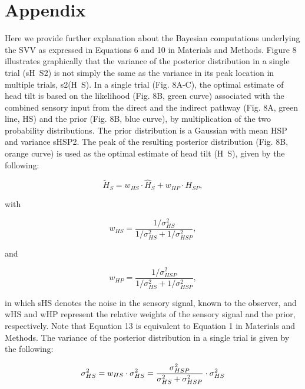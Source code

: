 \section{Appendix}

Here we provide further explanation about the Bayesian computations underlying the SVV as expressed in Equations 6 and 10 in Materials and Methods. Figure 8 illustrates graphically that the variance of the posterior distribution in a single trial (sH~S2) is not simply the same as the variance in its peak location in multiple trials, s2(H~S). In a single trial (Fig. 8A-C), the optimal estimate of head tilt is based on the likelihood (Fig. 8B, green curve) associated with the combined sensory input from the direct and the indirect pathway (Fig. 8A, green line, HS) and the prior (Fig. 8B, blue curve), by multiplication of the two probability distributions. The prior distribution is a Gaussian with mean HSP and variance sHSP2. The peak of the resulting posterior distribution (Fig. 8B, orange curve) is used as the optimal estimate of head tilt (H~S), given by the following: 

\begin{equation}
\label{p1eqn13}
\tilde{H}_S = w_{HS} \cdot \hat{H}_S + w_{HP} \cdot H_{SP},
\end{equation}

with

\begin{equation}
\label{p1eqn14}
w_{HS} = \frac{1 / \sigma^2_{HS}}{1 / \sigma^2_{HS} + 1 / \sigma^2_{HSP}},
\end{equation}

and

\begin{equation}
\label{p1eqn15}
w_{HP} = \frac{1 / \sigma^2_{HSP}}{1 / \sigma^2_{HS} + 1 / \sigma^2_{HSP}},
\end{equation}

in which sHS denotes the noise in the sensory signal, known to the observer, and wHS and wHP represent the relative weights of the sensory signal and the prior, respectively. Note that Equation 13 is equivalent to Equation 1 in Materials and Methods. The variance of the posterior distribution in a single trial is given by the following: 

\begin{equation}
\label{p1eqn16}
\sigma^2_{HS} = w_{HS} \cdot \sigma^2_{HS} \\
              = \frac{\sigma^2_{HSP}}{\sigma^2_{HS} + \sigma^2_{HSP}} \cdot \sigma^2_{HS}
\end{equation}


